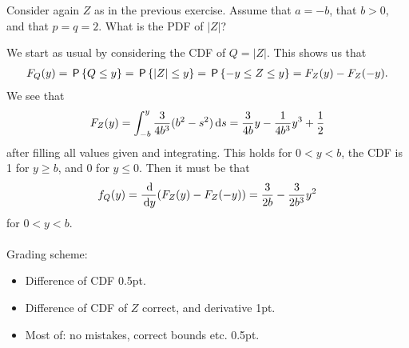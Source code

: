 \begin{exercise}[2]
Consider again $Z$ as in the previous exercise. Assume that $a=-b$, that $b>0$, and that $p=q=2$. What is the PDF of $\left|Z\right|$?
\begin{solution}
We start as usual by considering the CDF of $Q=\left|Z\right|$. This shows us that
\begin{align*}
    F_Q(y) = \P{Q\leq y} = \P{\left|Z\right|\leq y} = \P{-y\leq Z \leq y} = F_Z(y) - F_Z(-y).
\end{align*}
We see that
\begin{align*}
    F_Z(y) = \int_{-b}^y{\frac{3}{4b^3}(b^2-s^2)\d s} = \frac{3}{4b}y-\frac{1}{4b^3}y^3+\frac12
\end{align*}
after filling all values given and integrating. This holds for $0<y<b$, the CDF is 1 for $y\geq b$, and 0 for $y\leq 0$. Then it must be that
\begin{align*}
    f_Q(y) = \frac{\d}{\d y} (F_Z(y) - F_Z(-y)) = \frac{3}{2b}-\frac{3}{2b^3}y^2
\end{align*}
for $0< y< b$.
\\\\
Grading scheme:
\begin{itemize}
    \item Difference of CDF 0.5pt.
    \item Difference of CDF of $Z$ correct, and derivative 1pt.
    \item Most of: no mistakes, correct bounds etc. 0.5pt.
\end{itemize}
\end{solution}
\end{exercise}
